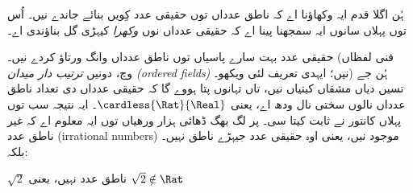 \documentclass[../../../include/open-logic-section]{subfiles}
\begin{document}

ہُن اگلا قدم ایہ وکھاؤنا اے کہ ناطق عدداں توں حقیقی عدد کِویں بنائے
جاندے نیں۔ اُس توں پہلاں سانوں ایہ سمجھنا پینا اے کہ حقیقی عدداں نوں
\emph{وکھرا} کیہڑی گل بناؤندی اے۔

حقیقی عدد بہت سارے پاسیاں توں ناطق عدداں وانگ ورتاؤ کردے نیں۔ (فنی
لفظاں وچ، دونیں \emph{ترتیب دار میدان (ordered fields)} نیں؛ ایہدی
تعریف لئی  ویکھو۔) ہُن جے تسیں
 دیاں مشقاں کیتیاں نیں، تاں تہانوں پتا ہووے گا
کہ حقیقی عدداں دی تعداد ناطق عدداں نالوں سختی نال ودھ اے، یعنی
$\cardless{\Rat}{\Real}$۔ ایہ نتیجہ سب توں پہلاں کانتور نے ثابت کیتا
سی۔ پر لگ بھگ ڈھائی ہزار ورھیاں توں ایہ معلوم اے کہ غیر ناطق عدد
(irrational numbers) موجود نیں، یعنی اوہ حقیقی عدد جیہڑے ناطق نہیں۔
بلکہ:
\begin{thm}
$\sqrt{2}$ ناطق عدد نہیں، یعنی $\sqrt{2} \notin \Rat$
\end{thm}
\end{document}

